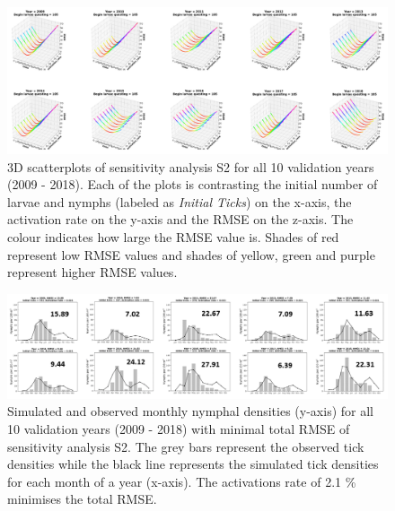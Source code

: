 \documentclass[a4paper, 11pt]{scrartcl}
\begin{document}
\begin{figure}
\centering
\includegraphics[width=\linewidth]{figures/initial_ticks_without_beech_error.png}
\caption{3D scatterplots of sensitivity analysis S2 for all 10 validation years (2009 - 2018). Each of the plots is contrasting the initial number of larvae and nymphs
(labeled as \textit{Initial Ticks}) on the x-axis, the activation rate on the y-axis and the RMSE on the z-axis. The colour indicates how large the RMSE value is. Shades of red
represent low RMSE values and shades of yellow, green and purple represent higher RMSE values.}
\label{fig:initial_ticks_without_beech_error_rotated}
\end{figure}

\begin{figure}
\centering
\includegraphics[width=\linewidth]{figures/initial_ticks_without_beech.png}
\caption{Simulated and observed monthly nymphal densities (y-axis) for all 10 validation years (2009 - 2018) with minimal total RMSE of sensitivity analysis S2. The grey bars
represent the observed tick densities while the black line represents the simulated tick densities for each month of a year (x-axis). The activations rate of 2.1 \% minimises
the total RMSE.}
\label{fig:initial_ticks_without_beech_rotated}
\end{figure}
\end{document}
